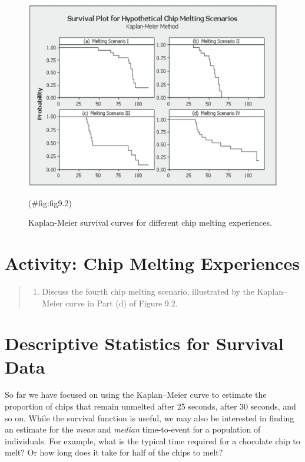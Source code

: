 \documentclass[
]{report}
\providecommand{\tightlist}{%
  \setlength{\itemsep}{0pt}\setlength{\parskip}{0pt}}
\begin{document}
\begin{figure}

{\centering \includegraphics[width=1\linewidth]{docs/Fig9_2} 

}

\caption{Kaplan-Meier survival curves for different chip melting experiences.}(\#fig:fig9.2)
\end{figure}

\section*{Activity: Chip Melting Experiences}\label{activity-chip-melting-experiences}

\begin{quote}
\begin{enumerate}
\def\labelenumi{\arabic{enumi}.}
\setcounter{enumi}{19}
\tightlist
\item
  Discuss the fourth chip melting scenario, illustrated by the Kaplan--Meier curve in Part (d) of Figure 9.2.
\end{enumerate}
\end{quote}

\section{\texorpdfstring{\textbf{Descriptive Statistics for Survival Data}}{Descriptive Statistics for Survival Data}}\label{descriptive-statistics-for-survival-data}

So far we have focused on using the Kaplan--Meier curve to estimate the proportion of chips that remain unmelted after 25 seconds, after 30 seconds, and so on. While the survival function is useful, we may also be interested in finding an estimate for the \emph{mean} and \emph{median} time-to-event for a population of individuals. For example, what is the typical time required for a chocolate chip to melt? Or how long does it take for half of the chips to melt?
\end{document}
